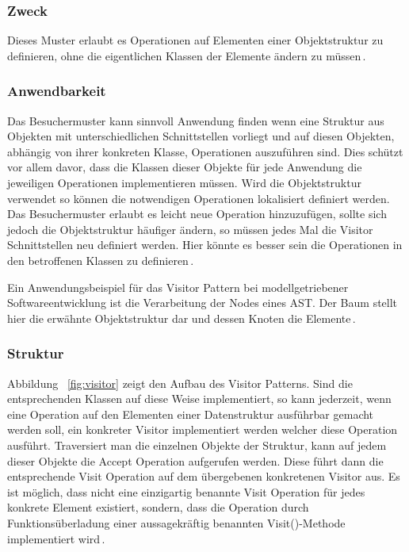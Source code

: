 \documentclass[12pt,oneside,a4paper,parskip]{scrbook}
\begin{document}
\subsubsection{Zweck}

Dieses Muster erlaubt es Operationen auf Elementen einer Objektstruktur zu definieren, ohne die eigentlichen Klassen der Elemente ändern zu müssen\,\cite[S. 480]{gamma2015}.

\subsubsection{Anwendbarkeit}

Das Besuchermuster kann sinnvoll Anwendung finden wenn eine Struktur aus Objekten mit unterschiedlichen Schnittstellen vorliegt und auf diesen Objekten, abhängig von ihrer konkreten Klasse, Operationen auszuführen sind. Dies schützt vor allem davor, dass die Klassen dieser Objekte für jede Anwendung die jeweiligen Operationen implementieren müssen. Wird die Objektstruktur verwendet so können die notwendigen Operationen lokalisiert definiert werden. Das Besuchermuster erlaubt es leicht neue Operation hinzuzufügen, sollte sich jedoch die Objektstruktur häufiger ändern, so müssen jedes Mal die Visitor Schnittstellen neu definiert werden. Hier könnte es besser sein die Operationen in den betroffenen Klassen zu definieren\,\cite[S. 484]{gamma2015}.

Ein Anwendungsbeispiel für das Visitor Pattern bei modellgetriebener Softwareentwicklung ist die Verarbeitung der Nodes eines AST. Der Baum stellt hier die erwähnte Objektstruktur dar und dessen Knoten die Elemente\,\cite[S. 480]{gamma2015}.

\subsubsection{Struktur}

Abbildung ~\ref{fig:visitor} zeigt den Aufbau des Visitor Patterns. Sind die entsprechenden Klassen auf diese Weise implementiert, so kann jederzeit, wenn eine Operation auf den Elementen einer Datenstruktur ausführbar gemacht werden soll, ein konkreter Visitor implementiert werden welcher diese Operation ausführt. Traversiert man die einzelnen Objekte der Struktur, kann auf jedem dieser Objekte die Accept Operation aufgerufen werden. Diese führt dann die entsprechende Visit Operation auf dem übergebenen konkretenen Visitor aus. Es ist möglich, dass nicht eine einzigartig benannte Visit Operation für jedes konkrete Element existiert, sondern, dass die Operation durch Funktionsüberladung einer aussagekräftig benannten Visit()-Methode implementiert wird\,\cite[S.485 ff.]{gamma2015}.
\end{document}
